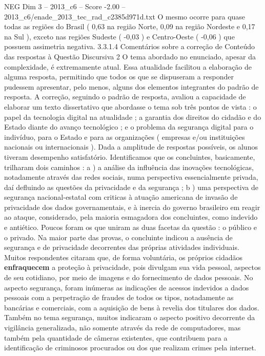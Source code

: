 \begin{textsample}{NEG Dim 3 – 2013\_c6 – Score -2.00 – 2013\_c6/enade\_2013\_tec\_rad\_c2385d971d.txt}
O mesmo ocorre para quase todas as regiões do Brasil ( 0,63 na região Norte, 0,09 na região Nordeste e 0,17 na Sul ), exceto nas regiões Sudeste ( -0,03 ) e Centro-Oeste ( -0,06 ) que possuem assimetria negativa. 3.3.1.4 Comentários sobre a correção de Conteúdo das respostas à Questão Discursiva 2 O tema abordado no enunciado, apesar da complexidade, é extremamente atual.
Essa atualidade facilitou a elaboração de alguma resposta, permitindo que todos os que se dispuseram a responder pudessem apresentar, pelo menos, alguns dos elementos integrantes do padrão de resposta.
A correção, seguindo o padrão de resposta, avaliou a capacidade de elaborar um texto dissertativo que abordasse o tema sob três pontos de vista : o papel da tecnologia digital na atualidade ; a garantia dos direitos do cidadão e do Estado diante do avanço tecnológico ; e o problema da segurança digital para o indivíduo, para o Estado e para as organizações ( empresas e/ou instituições nacionais ou internacionais ).
Dada a amplitude de respostas possíveis, os alunos tiveram desempenho satisfatório.
Identificamos que os concluintes, basicamente, trilharam dois caminhos : a ) a análise da influência das inovações tecnológicas, notadamente através das redes sociais, numa perspectiva essencialmente privada, daí defluindo as questões da privacidade e da segurança ; b ) uma perspectiva de segurança nacional-estatal com criticas à atuação americana de invasão de privacidade dos dados governamentais, e à inercia do governo brasileiro em reagir ao ataque, considerado, pela maioria esmagadora dos concluintes, como indevido e antiético.
Poucos foram os que uniram as duas facetas da questão : o público e o privado.
Na maior parte das provas, o concluinte indicou a ausência de segurança e de privacidade decorrentes das próprias atividades individuais.
Muitos respondentes citaram que, de forma voluntária, os próprios cidadãos \textbf{enfraquecem} a proteção à privacidade, pois divulgam sua vida pessoal, aspectos de seu cotidiano, por meio de imagens e do fornecimento de dados pessoais.
No aspecto segurança, foram inúmeras as indicações de acessos indevidos a dados pessoais com a perpetração de fraudes de todos os tipos, notadamente as bancárias e comerciais, com a aquisição de bens à revelia dos titulares dos dados.
Também no tema segurança, muitos indicaram o aspecto positivo decorrente da vigilância generalizada, não somente através da rede de computadores, mas também pela quantidade de câmeras existentes, que contribuem para a identificação de criminosos procurados ou dos que realizam crimes pela internet.

\end{textsample}
